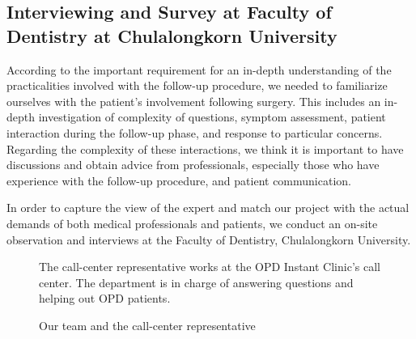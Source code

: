 \documentclass[12pt,oneside,openright,a4paper]{cpe-english-project}
\begin{document}
    \subsection{Interviewing and Survey at Faculty of Dentistry at Chulalongkorn University}
      \qquad According to the important requirement for an in-depth understanding of the practicalities involved with the follow-up procedure, we needed to familiarize ourselves with the patient's involvement following surgery. This includes an in-depth investigation of  complexity of questions, symptom assessment, patient interaction during the follow-up phase, and response to particular concerns. Regarding the complexity of these interactions, we think it is important to have discussions and obtain advice from professionals, especially those who have experience with the follow-up procedure, and patient communication. \par
      \qquad In order to capture the view of the expert and  match our project with the actual demands of both medical professionals and patients, we conduct an on-site observation and interviews at the Faculty of Dentistry, Chulalongkorn University. \par
      \begin{figure}[!h]
        \centering
        \caption{Our team and the call-center representative}\label{fig:Interview_1}
        \begin{flushleft}
          \qquad The call-center representative works at the OPD Instant Clinic's call center. The department is in charge of answering questions and helping out OPD patients. \par
        \end{flushleft}        
      \end{figure}
\end{document}
